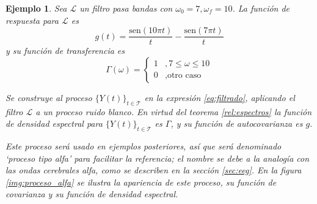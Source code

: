 \documentclass[12pt,letterpaper]{book}
\newtheorem{ejemplo}{Ejemplo}[chapter]
\newcommand{\SEN}[1]{\mathrm{sen}\left( #1 \right)}
\begin{document}
\begin{ejemplo}
Sea $\mathcal{L}$ un filtro pasa bandas con $\omega_0 = 7, \omega_f = 10$. 
%
La función de respuesta para $\mathcal{L}$ es
\begin{equation}
g(t) = \frac{\SEN{10 \pi t}}{t} - \frac{\SEN{7 \pi t}}{t}
\end{equation}
y su función de transferencia es
\begin{equation}
\Gamma(\omega) = \begin{cases}
1 &, 7 \leq \omega \leq 10 \\
0 &, \text{otro caso}
\end{cases}
\end{equation}

Se construye al proceso $\{Y(t)\}_{t\in \mathcal{T}}$ en la expresión \ref{eq:filtrado}, aplicando el filtro $\mathcal{L}$ a un proceso ruido blanco.
%
En virtud del teorema \ref{rel:espectros} la función de densidad espectral para $\{Y(t)\}_{t\in \mathcal{T}}$ es $\Gamma$, y su función de autocovarianza es $g$.

Este proceso será usado en ejemplos posteriores, así que será denominado `proceso tipo alfa' para facilitar la referencia; el nombre se debe a la analogía con las ondas cerebrales alfa, como se describen en la sección \ref{sec:eeg}.
%
En la figura \ref{img:proceso_alfa} se ilustra la apariencia de este proceso, su función de covarianza y su función de densidad espectral.
\label{lazy:proceso_alfa}
\end{ejemplo}
\end{document}
